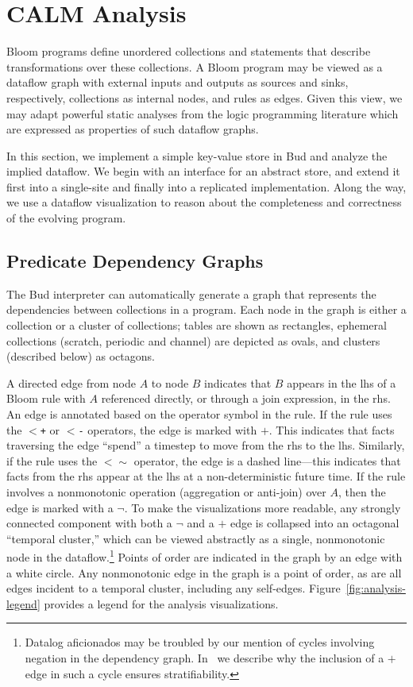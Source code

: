 \section{CALM Analysis}
Bloom programs define unordered collections and statements that describe
transformations over these collections.  A Bloom program may be viewed as a
dataflow graph with external inputs and outputs as sources and sinks,
respectively, collections as internal nodes, and rules as edges.  Given this
view, we may adapt powerful static analyses from the logic programming
literature which are expressed as properties of such dataflow graphs.

In this section, we implement a simple key-value store in Bud and analyze the
implied dataflow.  We begin with an interface for an abstract store, and extend
it first into a single-site and finally into a replicated implementation.  Along
the way, we use a dataflow visualization to reason about the completeness and
correctness of the evolving program.

\subsection{Predicate Dependency Graphs}
The Bud interpreter can automatically generate a graph that represents the
dependencies between collections in a program. Each node in the graph is either
a collection or a cluster of collections; tables are shown as rectangles,
ephemeral collections (scratch, periodic and channel) are depicted as ovals, and
clusters (described below) as octagons.

A directed edge from node $A$ to node $B$ indicates that $B$ appears in the lhs
of a Bloom rule with $A$ referenced directly, or through a join expression, in
the rhs.  An edge is annotated based on the operator symbol in the rule. If the
rule uses the \texttt{$<$+} or \texttt{$<$-} operators, the edge is marked with
$+$. This indicates that facts traversing the edge ``spend'' a timestep to move
from the rhs to the lhs. Similarly, if the rule uses the \texttt{$<\sim$}
operator, the edge is a dashed line---this indicates that facts from the rhs
appear at the lhs at a non-deterministic future time. If the rule involves a
nonmonotonic operation (aggregation or anti-join) over $A$, then the edge is
marked with a $\lnot$.  To make the visualizations more readable, any strongly
connected component with both a $\lnot$ and a $+$ edge is collapsed into an
octagonal ``temporal cluster,'' which can be viewed abstractly as a single,
nonmonotonic node in the dataflow.\footnote{Datalog aficionados may be troubled
  by our mention of cycles involving negation in the dependency graph.
  In~\cite{dedalus} we describe why the inclusion of a $+$ edge in such a cycle
  ensures stratifiability.}  Points of order are indicated in the graph by an
edge with a white circle.  Any nonmonotonic edge in the graph is a point of
order, as are all edges incident to a temporal cluster, including any
self-edges.  Figure~\ref{fig:analysis-legend} provides a legend for the analysis
visualizations.

